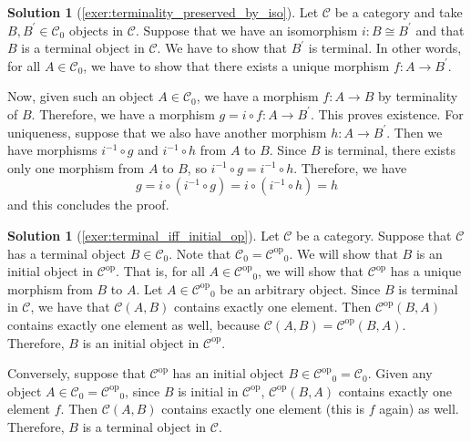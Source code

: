 \documentclass[a4paper,11pt, oneside,titlepage=false]{scrbook}
\theoremstyle{plain}
\theoremstyle{definition}
\newtheorem{solution}[thm]{Solution}
\newcommand{\Cat}[1]{\mathcal{#1}}
\newcommand{\CC}{\Cat{C}}
\newcommand{\Ob}[1]{{#1}_0}
\newcommand{\op}[1]{\ensuremath{{#1}^\text{op}}}
\newcommand{\Inv}[1]{#1 ^{-1}}
\begin{document}
\begin{solution}[\cref{exer:terminality_preserved_by_iso}]\label{sol:terminality_preserved_by_iso}
	Let $ \CC $ be a category and take $ B, B^\prime \in \Ob\CC $ objects in $ \CC $. Suppose that we have an isomorphism $ i: B \cong B^\prime $ and that $ B $ is a terminal object in $ \CC $. We have to show that $ B^\prime $ is terminal. In other words, for all $ A \in \Ob\CC $, we have to show that there exists a unique morphism $ f: A \to B^\prime $.

	Now, given such an object $ A \in \Ob\CC $, we have a morphism $ f: A \to B $ by terminality of $ B $. Therefore, we have a morphism $ g = i \circ f: A \to B^\prime $. This proves existence. For uniqueness, suppose that we also have another morphism $ h: A \to B^\prime $. Then we have morphisms $ \Inv{i} \circ g $ and $ \Inv{i} \circ h $ from $ A $ to $ B $. Since $ B $ is terminal, there exists only one morphism from $ A $ to $ B $, so $ \Inv{i} \circ g = \Inv{i} \circ h $. Therefore, we have
	\[ g = i \circ (\Inv{i} \circ g) = i \circ (\Inv i \circ h) = h \]
	and this concludes the proof.
\end{solution}

\begin{solution}[\cref{exer:terminal_iff_initial_op}]\label{sol:terminal_iff_initial_op}
  Let $ \CC $ be a category. Suppose that $ \CC $ has a terminal object $ B \in \Ob\CC $. Note that $ \Ob\CC = \Ob{\op\CC} $. We will show that $ B $ is an initial object in $ \op\CC $. That is, for all $ A \in \Ob{\op\CC} $, we will show that $ \op\CC $ has a unique morphism from $ B $ to $ A $.
  Let $ A \in \Ob{\op\CC} $ be an arbitrary object. Since $ B $ is terminal in $ \CC $, we have that $ \CC(A, B) $ contains exactly one element. Then $ \op\CC(B, A) $ contains exactly one element as well, because $ \CC(A, B) = \op\CC(B, A) $. Therefore, $ B $ is an initial object in $ \op\CC $.

  Conversely, suppose that $ \op\CC $ has an initial object $ B \in \Ob{\op\CC} = \Ob\CC $. Given any object $ A \in \Ob\CC = \Ob{\op\CC}  $, since $ B $ is initial in $ \op\CC $, $ \op\CC(B, A) $ contains exactly one element $ f $. Then $ \CC(A, B) $ contains exactly one element (this is $ f $ again) as well. Therefore, $ B $ is a terminal object in $ \CC $.
\end{solution}
\end{document}
